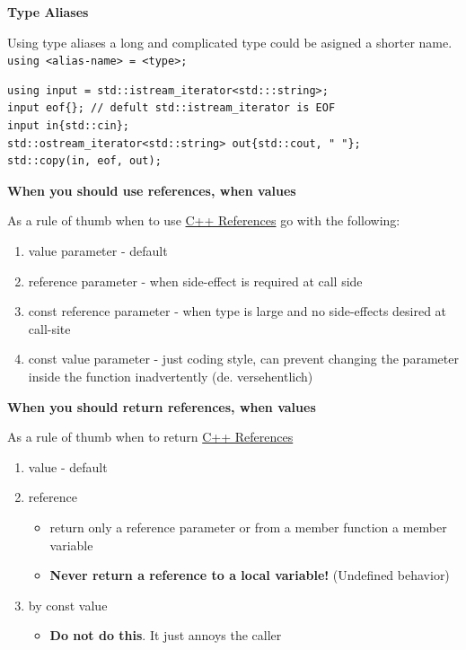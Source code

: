 \documentclass[11pt,twoside,landscape]{article}
\begin{document}
\begin{multicols}{3}
\textbf{Type Aliases}

Using type aliases a long and complicated type could be asigned a shorter name.
\texttt{using <alias-name> = <type>;}

\lstset{language=c++,label= ,caption= ,captionpos=b,numbers=none}
\begin{lstlisting}
using input = std::istream_iterator<std:::string>;
input eof{}; // defult std::istream_iterator is EOF
input in{std::cin};
std::ostream_iterator<std::string> out{std::cout, " "};
std::copy(in, eof, out);
\end{lstlisting}

\textbf{When you should use references, when values}

As a rule of thumb when to use \href{../../../roam/20210920111001-c_references.org}{C++ References} go with the following:

\begin{enumerate}
\item value parameter - default
\item reference parameter - when side-effect is required at call side
\item const reference parameter - when type is large and no side-effects desired at call-site
\item const value parameter - just coding style, can prevent changing the parameter inside the function inadvertently (de. versehentlich)
\end{enumerate}

\textbf{When you should return references, when values}

As a rule of thumb when to return \href{../../../roam/20210920111001-c_references.org}{C++ References}
\begin{enumerate}
\item value - default
\item reference
\begin{itemize}
\item return only a reference parameter or from a member function a member variable
\item \textbf{Never return a reference to a local variable!} (Undefined behavior)
\end{itemize}
\item by const value
\begin{itemize}
\item \textbf{Do not do this}. It just annoys the caller
\end{itemize}
\end{enumerate}


\end{multicols}
\end{document}
